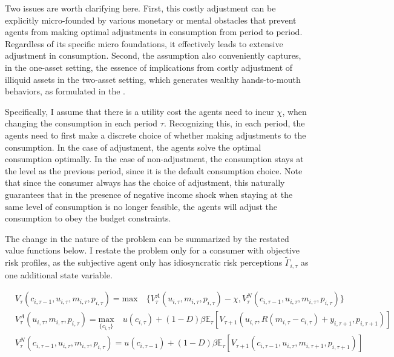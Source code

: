 Two issues are worth clarifying here. First, this costly adjustment can be explicitly micro-founded by various monetary or mental obstacles that prevent agents from making optimal adjustments in consumption from period to period. Regardless of its specific micro foundations, it effectively leads to extensive adjustment in consumption. Second, the assumption also conveniently captures, in the one-asset setting, the essence of implications from costly adjustment of illiquid assets in the two-asset setting, which generates wealthy hands-to-mouth behaviors, as formulated in the \citep{kaplan2014model}. 


Specifically, I assume that there is a utility cost the agents need to incur $\chi$, when changing the consumption in each period $\tau$. Recognizing this, in each period, the agents need to first make a discrete choice of whether making adjustments to the consumption. In the case of adjustment, the agents solve the optimal consumption optimally. In the case of non-adjustment, the consumption stays at the level as the previous period, since it is the default consumption choice. Note that since the consumer always has the choice of adjustment, this naturally guarantees that in the presence of negative income shock when staying at the same level of consumption is no longer feasible, the agents will adjust the consumption to obey the budget constraints. 

The change in the nature of the problem can be summarized by the restated value functions below. I restate the problem only for a consumer with objective risk profiles, as the subjective agent only has idiosyncratic risk perceptions $\tilde \Gamma_{i,\tau}$ as one additional state variable. 

\begin{equation}
\begin{split}
& V_{\tau}(c_{i,\tau-1},u_{i,\tau}, m_{i,\tau}, p_{i,\tau}) = \textrm{max} \quad \{V^A_{\tau}(u_{i,\tau}, m_{i,\tau}, p_{i,\tau})-\chi,V^N_{\tau}(c_{i,\tau-1},u_{i,\tau}, m_{i,\tau}, p_{i,\tau})\} \\
& V^A_{\tau}(u_{i,\tau}, m_{i,\tau}, p_{i,\tau}) = \underset{\{c_{i,\tau}\}}{\textrm{max}} \quad u(c_{i,\tau}) + (1-D)\beta \mathbb{E}_{\tau}\left[V_{\tau+1}(u_{i,\tau},R(m_{i,\tau}-c_{i,\tau})+y_{i,\tau+1}, p_{i,\tau+1})\right]  \\
& V^N_{\tau}(c_{i,\tau-1},u_{i,\tau}, m_{i,\tau}, p_{i,\tau}) =  u(c_{i,\tau-1}) + (1-D)\beta \mathbb{E}_{\tau}\left[V_{\tau+1}(c_{i,\tau-1},u_{i,\tau},m_{i,\tau+1}, p_{i,\tau+1})\right]
\end{split}
\end{equation}

